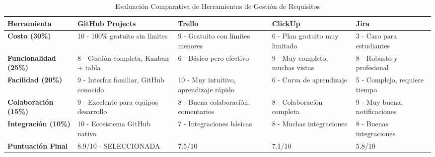 \documentclass[12pt,a4paper]{article}
\begin{document}
\begin{table}[H]
\centering
\caption{Evaluación Comparativa de Herramientas de Gestión de Requisitos}
\begin{tabular}{|p{3cm}|p{2.5cm}|p{2.5cm}|p{2.5cm}|p{2.5cm}|}
\hline
\rowcolor{headercolor!30}
\textbf{\color{white}Herramienta} & \textbf{\color{white}GitHub Projects} & \textbf{\color{white}Trello} & \textbf{\color{white}ClickUp} & \textbf{\color{white}Jira} \\
\hline
\textbf{Costo (30\%)} & 
10 - 100\% gratuito sin límites & 
9 - Gratuito con límites menores & 
6 - Plan gratuito muy limitado & 
3 - Caro para estudiantes \\
\hline
\textbf{Funcionalidad (25\%)} & 
8 - Gestión completa, Kanban + tabla & 
6 - Básico pero efectivo & 
9 - Muy completo, muchas vistas & 
8 - Robusto y profesional \\
\hline
\textbf{Facilidad (20\%)} & 
9 - Interfaz familiar, GitHub conocido & 
10 - Muy intuitivo, aprendizaje rápido & 
6 - Curva de aprendizaje & 
5 - Complejo, requiere tiempo \\
\hline
\textbf{Colaboración (15\%)} & 
9 - Excelente para equipos desarrollo & 
8 - Buena colaboración, comentarios & 
8 - Colaboración completa & 
9 - Muy buena, notificaciones \\
\hline
\textbf{Integración (10\%)} & 
10 - Ecosistema GitHub nativo & 
7 - Integraciones básicas & 
8 - Muchas integraciones & 
8 - Buenas integraciones \\
\hline
\hline
\rowcolor{successgreen!30}
\textbf{Puntuación Final} & 
8.9/10 - SELECCIONADA & 
7.5/10 & 
7.1/10 & 
5.8/10 \\
\hline
\end{tabular}
\end{table}
\end{document}
